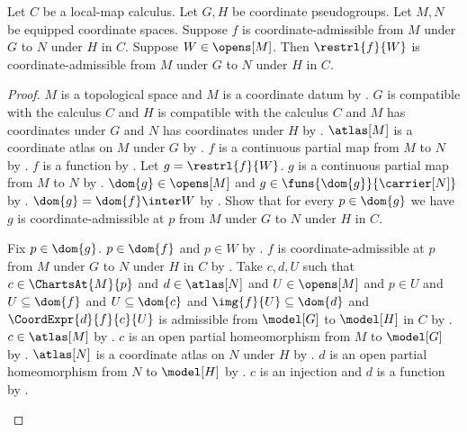 \begin{theorem}\label{coordinate_admissible_restriction}
    Let $C$ be a local-map calculus.
    Let $G,H$ be coordinate pseudogroups.
    Let $M,N$ be equipped coordinate spaces.
    Suppose $f$ is coordinate-admissible from $M$ under $G$ to $N$ under $H$ in $C$.
    Suppose $W\in\opens[M]$.
    Then $\restrl{f}{W}$ is coordinate-admissible from $M$ under $G$ to $N$ under $H$ in $C$.
\end{theorem}
\begin{proof}
    $M$ is a topological space and $M$ is a coordinate datum by .
    $G$ is compatible with the calculus $C$ and $H$ is compatible with the calculus $C$ and
        $M$ has coordinates under $G$ and $N$ has coordinates under $H$ by
        .
    $\atlas[M]$ is a coordinate atlas on $M$ under $G$ by .
    $f$ is a continuous partial map from $M$ to $N$ by .
    $f$ is a function by .
    Let $g=\restrl{f}{W}$.
    $g$ is a continuous partial map from $M$ to $N$ by .
    $\dom{g}\in\opens[M]$ and $g\in\funs{\dom{g}}{\carrier[N]}$ by
        .
    $\dom{g}=\dom{f}\inter W$ by .
    Show that for every $p\in\dom{g}$ we have
        $g$ is coordinate-admissible at $p$ from $M$ under $G$ to $N$ under $H$ in $C$.
    \begin{subproof}
        Fix $p\in\dom{g}$.
        $p\in\dom{f}$ and $p\in W$ by .
        $f$ is coordinate-admissible at $p$ from $M$ under $G$ to $N$ under $H$ in $C$ by
            .
        Take $c,d,U$ such that $c\in\ChartsAt{M}{p}$ and $d\in\atlas[N]$ and
            $U\in\opens[M]$ and $p\in U$ and $U\subseteq\dom{f}$ and $U\subseteq\dom{c}$ and
            $\img{f}{U}\subseteq\dom{d}$ and
            $\CoordExpr{d}{f}{c}{U}$ is admissible from $\model[G]$ to $\model[H]$ in $C$
            by .
        $c\in\atlas[M]$ by .
        $c$ is an open partial homeomorphism from $M$ to $\model[G]$ by .
        $\atlas[N]$ is a coordinate atlas on $N$ under $H$ by .
        $d$ is an open partial homeomorphism from $N$ to $\model[H]$ by .
        $c$ is an injection and $d$ is a function by
            .

\end{subproof}
\end{proof}
